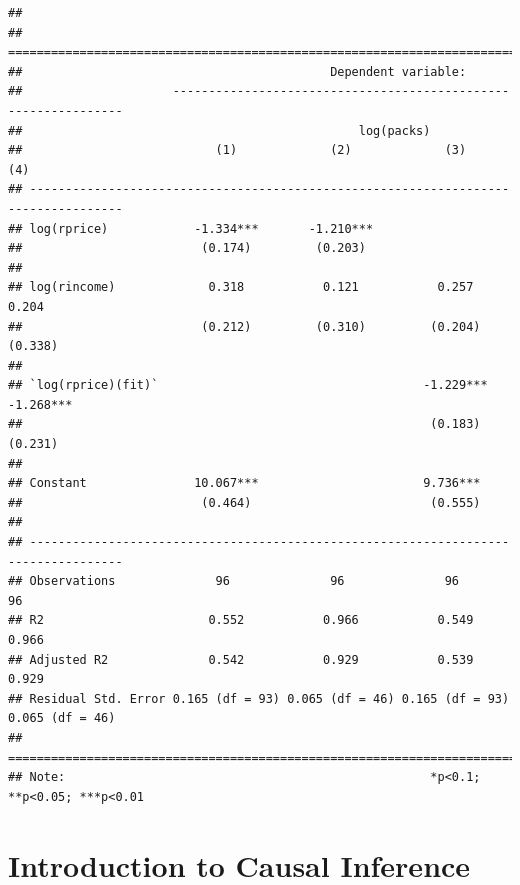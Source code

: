 \documentclass[]{book}
\begin{document}
\begin{verbatim}
## 
## ===================================================================================
##                                           Dependent variable:                      
##                     ---------------------------------------------------------------
##                                               log(packs)                           
##                           (1)             (2)             (3)             (4)      
## -----------------------------------------------------------------------------------
## log(rprice)            -1.334***       -1.210***                                   
##                         (0.174)         (0.203)                                    
##                                                                                    
## log(rincome)             0.318           0.121           0.257           0.204     
##                         (0.212)         (0.310)         (0.204)         (0.338)    
##                                                                                    
## `log(rprice)(fit)`                                     -1.229***       -1.268***   
##                                                         (0.183)         (0.231)    
##                                                                                    
## Constant               10.067***                       9.736***                    
##                         (0.464)                         (0.555)                    
##                                                                                    
## -----------------------------------------------------------------------------------
## Observations              96              96              96              96       
## R2                       0.552           0.966           0.549           0.966     
## Adjusted R2              0.542           0.929           0.539           0.929     
## Residual Std. Error 0.165 (df = 93) 0.065 (df = 46) 0.165 (df = 93) 0.065 (df = 46)
## ===================================================================================
## Note:                                                   *p<0.1; **p<0.05; ***p<0.01
\end{verbatim}

\chapter{Introduction to Causal
Inference}\label{introduction-to-causal-inference}
\end{document}

